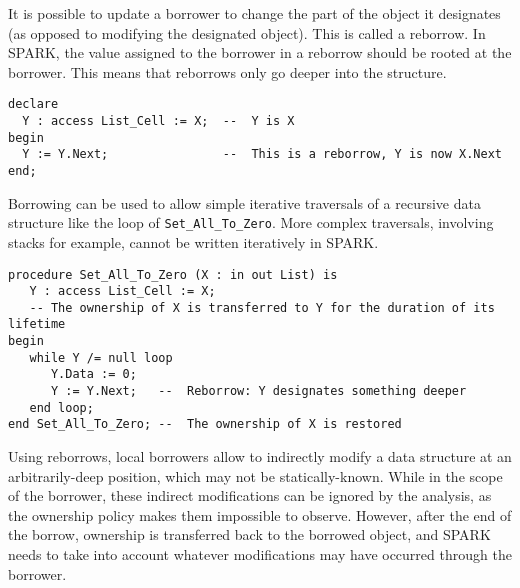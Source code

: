 \documentclass[runningheads]{llncs}
\begin{document}
It is possible to update a borrower to change the part of the object it designates (as opposed to modifying the designated object). This is called a reborrow. In SPARK, the value assigned to the borrower in a reborrow should be rooted at the borrower. This means that reborrows only go deeper into the structure.
\begin{lstlisting}
declare
  Y : access List_Cell := X;  --  Y is X
begin
  Y := Y.Next;                --  This is a reborrow, Y is now X.Next
end;
\end{lstlisting}
Borrowing can be used to allow simple iterative traversals of a recursive data structure like the loop of \texttt{Set\_All\_To\_Zero}. More complex traversals, involving stacks for example, cannot be written iteratively in SPARK.
\begin{lstlisting}
procedure Set_All_To_Zero (X : in out List) is
   Y : access List_Cell := X;
   -- The ownership of X is transferred to Y for the duration of its lifetime
begin
   while Y /= null loop
      Y.Data := 0;
      Y := Y.Next;   --  Reborrow: Y designates something deeper
   end loop;
end Set_All_To_Zero; --  The ownership of X is restored
\end{lstlisting}
Using reborrows, local borrowers allow to indirectly modify a data structure at an arbitrarily-deep position, which may not be statically-known. While in the scope of the borrower, these indirect modifications can be ignored by the analysis, as the ownership policy makes them impossible to observe. However, after the end of the borrow, ownership is transferred back to the borrowed object, and SPARK needs to take into account whatever modifications may have occurred through the borrower.
\end{document}
